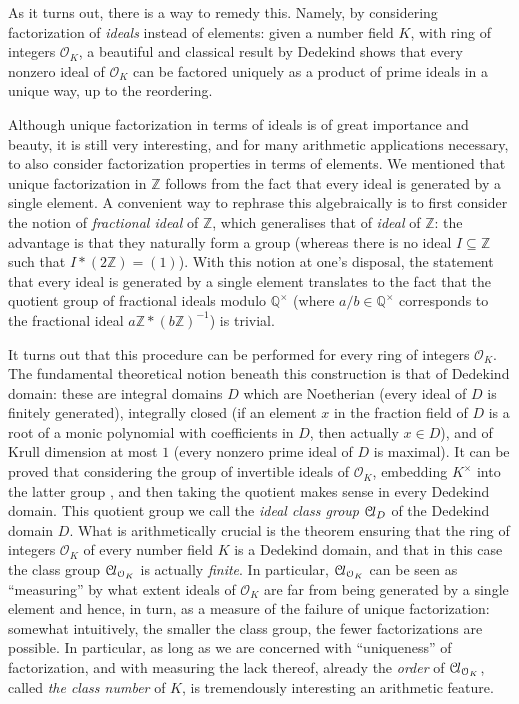 \documentclass[a4paper,USenglish,cleveref, autoref, thm-restate]{lipics-v2021}
\newcommand*{\OK}[1][K]{\mathcal{O}_{#1}}
\newcommand*{\Cl}{\mathcal{C}\kern-.075em l}
\newcommand{\Q}{\mathbb{Q}}
\newcommand{\Z}{\mathbb{Z}}
\begin{document}
As it turns out, there is a way to remedy this. Namely,  by considering factorization of \emph{ideals} instead of elements: given a number field $K$, with ring of integers $\OK$, a beautiful and classical result by Dedekind shows that every nonzero ideal of $\OK$ can be factored uniquely as a product of prime ideals in a unique way, up to the reordering.

Although unique factorization in terms of ideals is of great importance and beauty, it is still very interesting, and for many arithmetic applications necessary, to also consider factorization properties in terms of elements. We mentioned that unique factorization in $\Z$ follows from the fact that every ideal is generated by a single element. A convenient way to rephrase this algebraically is to first consider the notion of \emph{fractional ideal} of $\Z$, which generalises that of \emph{ideal} of $\Z$: the advantage is that they naturally form a group (whereas there is no ideal $I\subseteq \Z$ such that $I*(2\Z)=(1)$). With this notion at one's disposal, the statement that every ideal is generated by a single element translates to the fact that the quotient group of fractional ideals modulo $\Q^\times$ (where $a/b\in\Q^\times$ corresponds to the fractional ideal $a\Z\ast (b\Z)^{-1}$) is trivial.

It turns out that this procedure can be %
performed for every ring of integers $\OK$. The fundamental theoretical notion beneath this construction is that of Dedekind domain: these are integral domains $D$ which are Noetherian (every ideal of $D$ is finitely generated), integrally closed (if an element $x$ in the fraction field of $D$ is a root of a monic polynomial with coefficients in $D$, then actually $x \in D$), and of Krull dimension at most $1$ (every nonzero prime ideal of $D$ is maximal). It can be proved that considering the group of invertible ideals of $\OK$, embedding $K^\times$ into the latter group%
, and then taking the quotient makes sense in every Dedekind domain. This quotient group we call the \emph{ideal class group} $\Cl_D$ of the Dedekind domain $D$. %
 What is arithmetically crucial is the theorem ensuring that the ring of integers $\OK$ of every number field $K$ is a Dedekind domain, and that in this case the class group $\Cl_{\OK}$ is actually \emph{finite}. In particular, $\Cl_{\OK}$ can be seen as ``measuring'' by what extent ideals of $\OK$ are far from being generated by a single element and hence, in turn, as a measure of the failure of unique factorization: somewhat intuitively, the smaller the class group, the fewer factorizations are possible. In particular, as long as we are concerned with ``uniqueness'' of factorization, and with measuring the lack thereof, already the \emph{order} of $\Cl_{\OK}$, called \emph{the class number} of $K$, is tremendously interesting an arithmetic feature.
 
\end{document}
